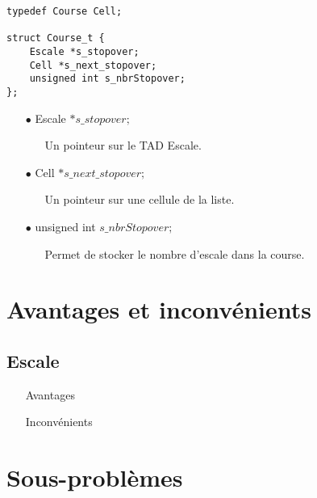 \documentclass[a4paper, 11pt, oneside]{article}
\begin{document}
		\begin{lstlisting}
typedef Course Cell;

struct Course_t {
	Escale *s_stopover;
	Cell *s_next_stopover;
	unsigned int s_nbrStopover;
};
		\end{lstlisting}

		\begin{itemize}
			\item[$\bullet$] Escale $*s\_stopover;$
			\begin{itemize}
				\item[] Un pointeur sur le TAD Escale.
			\end{itemize}
			\item[$\bullet$] Cell $*s\_next\_stopover;$
			\begin{itemize}
				\item[] Un pointeur sur une cellule de la liste.
			\end{itemize}
			\item[$\bullet$] unsigned int $s\_nbrStopover;$
			\begin{itemize}
				\item[] Permet de stocker le nombre d'escale dans la course.
			\end{itemize}
		\end{itemize}

\section{Avantages et inconvénients}

	\subsection{Escale}

		\begin{itemize}
			\item[] Avantages
			\begin{itemize}
				\item[]
			\end{itemize}
			\item[] Inconvénients
			\begin{itemize}
				\item[]
			\end{itemize}
		\end{itemize}

\section{Sous-problèmes}
\end{document}
